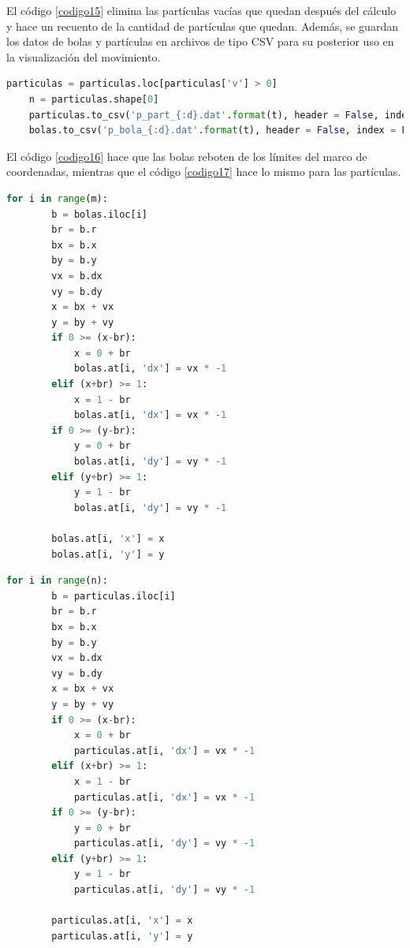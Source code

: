 \documentclass{report}
\begin{document}
El c\'odigo \ref{codigo15} elimina las part\'iculas vac\'ias que quedan despu\'es del c\'alculo y hace un recuento de la cantidad de part\'iculas que quedan. Adem\'as, se guardan los datos de bolas y part\'iculas en archivos de tipo CSV para su posterior uso en la visualizaci\'on del movimiento.

\begin{lstlisting}[caption=Eliminacio\'on de Part\'iculas Vac\'ias y Guardado de Datos, label=codigo15, language=Python]
    particulas = particulas.loc[particulas['v'] > 0]
    n = particulas.shape[0]
    particulas.to_csv('p_part_{:d}.dat'.format(t), header = False, index = False)
    bolas.to_csv('p_bola_{:d}.dat'.format(t), header = False, index = False)
\end{lstlisting}

El c\'odigo \ref{codigo16} hace que las bolas reboten de los l\'imites del marco de coordenadas, mientras que el c\'odigo \ref{codigo17} hace lo mismo para las part\'iculas.\\

\begin{lstlisting}[caption=Rebote de las Bolas en los L\'imites, label=codigo16, language=Python]
    for i in range(m):
        b = bolas.iloc[i]
        br = b.r
        bx = b.x
        by = b.y
        vx = b.dx
        vy = b.dy
        x = bx + vx
        y = by + vy
        if 0 >= (x-br):
            x = 0 + br
            bolas.at[i, 'dx'] = vx * -1
        elif (x+br) >= 1:
            x = 1 - br
            bolas.at[i, 'dx'] = vx * -1
        if 0 >= (y-br):
            y = 0 + br
            bolas.at[i, 'dy'] = vy * -1
        elif (y+br) >= 1:
            y = 1 - br
            bolas.at[i, 'dy'] = vy * -1
        
        bolas.at[i, 'x'] = x
        bolas.at[i, 'y'] = y
\end{lstlisting}

\begin{lstlisting}[caption=Rebote de las Part\'iculas en los L\'imites, label=codigo17, language=Python]
    for i in range(n):
        b = particulas.iloc[i]
        br = b.r
        bx = b.x
        by = b.y
        vx = b.dx
        vy = b.dy
        x = bx + vx
        y = by + vy
        if 0 >= (x-br):
            x = 0 + br
            particulas.at[i, 'dx'] = vx * -1
        elif (x+br) >= 1:
            x = 1 - br
            particulas.at[i, 'dx'] = vx * -1
        if 0 >= (y-br):
            y = 0 + br
            particulas.at[i, 'dy'] = vy * -1
        elif (y+br) >= 1:
            y = 1 - br
            particulas.at[i, 'dy'] = vy * -1
        
        particulas.at[i, 'x'] = x
        particulas.at[i, 'y'] = y
\end{lstlisting}
\end{document}
